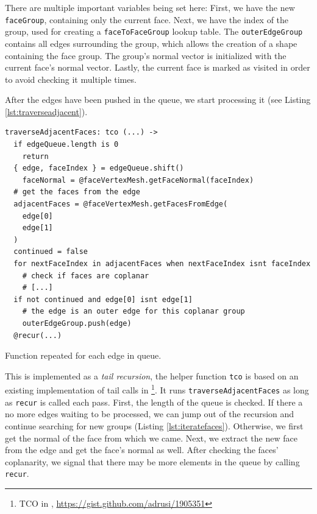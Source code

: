 \documentclass[../ClassicThesis.tex]{subfiles}
\begin{document}
There are multiple important variables being set here: First, we have the new \texttt{faceGroup}, containing only the current face. Next, we have the index of the group, used for creating a \texttt{faceToFaceGroup} lookup table. The \texttt{outerEdgeGroup} contains all edges surrounding the group, which allows the creation of a shape containing the face group. The group's normal vector is initialized with the current face's normal vector. Lastly, the current face is marked as visited in order to avoid checking it multiple times.

After the edges have been pushed in the queue, we start processing it (see Listing \ref{lst:traverseadjacent}).  

\begin{listing}
\begin{verbatim}
traverseAdjacentFaces: tco (...) ->
  if edgeQueue.length is 0
    return
  { edge, faceIndex } = edgeQueue.shift()
    faceNormal = @faceVertexMesh.getFaceNormal(faceIndex)
  # get the faces from the edge
  adjacentFaces = @faceVertexMesh.getFacesFromEdge(
    edge[0]
    edge[1]
  )
  continued = false
  for nextFaceIndex in adjacentFaces when nextFaceIndex isnt faceIndex
    # check if faces are coplanar
    # [...]
  if not continued and edge[0] isnt edge[1]
    # the edge is an outer edge for this coplanar group
    outerEdgeGroup.push(edge)
  @recur(...)
\end{verbatim}
\caption{Function repeated for each edge in queue.}
\label{lst:traverseadjacent}
\end{listing}


This is implemented as a \emph{tail recursion}, the helper function \texttt{tco} is based on an existing implementation of tail calls in \coffeescript\footnote{TCO in \coffeescript, \url{https://gist.github.com/adrusi/1905351}}. It runs \texttt{traverseAdjacentFaces} as long as \texttt{recur} is called each pass. First, the length of the queue is checked. If there a no more edges waiting to be processed, we can jump out of the recursion and continue searching for new groups (Listing \ref{lst:iteratefaces}). Otherwise, we first get the normal of the face from which we came. Next, we extract the new face from the edge and get the face's normal as well. After checking the faces' coplanarity, we signal that there may be more elements in the queue by calling \texttt{recur}.
\end{document}
